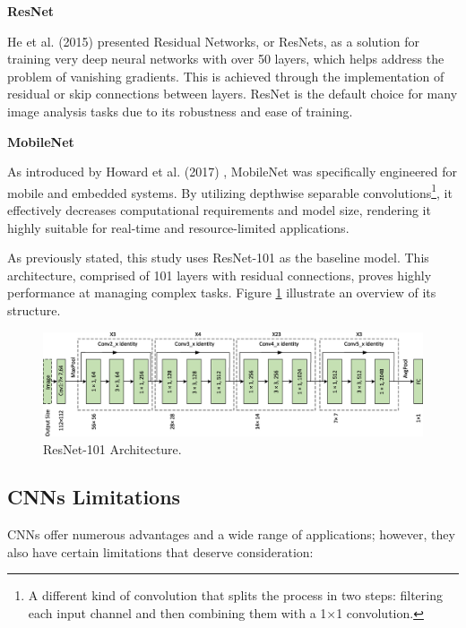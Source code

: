\documentclass[a4paper,10pt]{book}
\begin{document}
\textbf{ResNet}

He et al. (2015) \cite{he_deep_2015} presented Residual Networks, or ResNets, as a solution for training very deep neural networks with over 50 layers, which helps address the problem of vanishing gradients. This is achieved through the implementation of residual or skip connections between layers. ResNet is the default choice for many image analysis tasks due to its robustness and ease of training.

\textbf{MobileNet}

As introduced by Howard et al. (2017) \cite{howardMobileNetsEfficientConvolutional2017}, MobileNet was specifically engineered for mobile and embedded systems. By utilizing depthwise separable convolutions\footnote{A different kind of convolution that splits the process in two steps: filtering each input channel and then combining them with a 1×1 convolution.}, it effectively decreases computational requirements and model size, rendering it highly suitable for real-time and resource-limited applications.

As previously stated, this study uses ResNet-101 as the baseline model. This architecture, comprised of 101 layers with residual connections, proves highly performance at managing complex tasks. Figure \ref{fig:resnet_101} illustrate an overview of its structure.

\begin{figure}[h!]
    \centering
    \includegraphics[width=0.75\linewidth]{reports//assets/resnet101.jpg}
    \caption[ResNet-101 Architecture]{ResNet-101 Architecture.}
    \label{fig:resnet_101}
\end{figure}


\subsection{CNNs Limitations}

CNNs offer numerous advantages and a wide range of applications; however, they also have certain limitations that deserve consideration:
\end{document}
